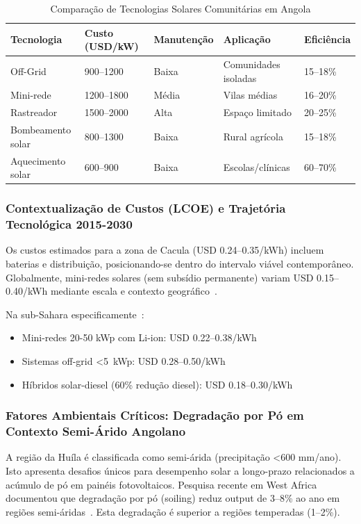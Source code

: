 \documentclass[12pt, a4paper]{article}
\begin{document}
\begin{table}[H]
\centering
\caption{Comparação de Tecnologias Solares Comunitárias em Angola}
\label{Tab:6}
\footnotesize
\begin{tabular}{|l|l|l|l|l|}
\hline
\textbf{Tecnologia} & \textbf{Custo (USD/kW)} & \textbf{Manutenção} & \textbf{Aplicação} & \textbf{Eficiência} \\
\hline
Off-Grid & 900--1200 & Baixa & Comunidades isoladas & 15--18\% \\
Mini-rede & 1200--1800 & Média & Vilas médias & 16--20\% \\
Rastreador & 1500--2000 & Alta & Espaço limitado & 20--25\% \\
Bombeamento solar & 800--1300 & Baixa & Rural agrícola & 15--18\% \\
Aquecimento solar & 600--900 & Baixa & Escolas/clínicas & 60--70\% \\
\hline
\end{tabular}
\end{table}

\subsubsection{Contextualização de Custos (LCOE) e Trajetória Tecnológica 2015-2030}

Os custos estimados para a zona de Cacula (USD 0.24--0.35/kWh) incluem baterias e distribuição, posicionando-se dentro do intervalo viável contemporâneo.
Globalmente, mini-redes solares (sem subsídio permanente) variam USD 0.15--0.40/kWh mediante escala e contexto geográfico~\citep{Ramasamy2022}.

Na sub-Sahara especificamente~\citep{IRENA2022}:
\begin{itemize}
\item Mini-redes 20-50 kWp com Li-ion: USD 0.22--0.38/kWh
\item Sistemas off-grid <5~kWp: USD 0.28--0.50/kWh
\item Híbridos solar-diesel (60\% redução diesel): USD 0.18--0.30/kWh
\end{itemize}

\subsubsection{Fatores Ambientais Críticos: Degradação por Pó em Contexto Semi-Árido Angolano}

A região da Huíla é classificada como semi-árida (precipitação <600 mm/ano).
Isto apresenta desafios únicos para desempenho solar a longo-prazo relacionados a acúmulo de pó em painéis fotovoltaicos.
Pesquisa recente em West Africa documentou que degradação por pó (soiling) reduz output de 3--8\% ao ano em regiões semi-áridas~\citep{Isaacs2025}.
Esta degradação é superior a regiões temperadas (1--2\%).
\end{document}
